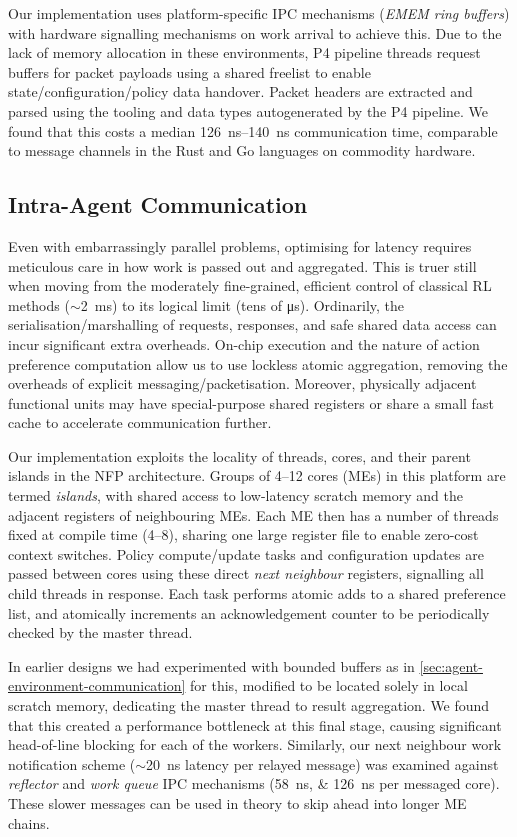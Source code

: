 \documentclass[sigconf,natbib=false]{acmart}
\begin{document}
Our implementation uses platform-specific IPC mechanisms (\emph{EMEM ring buffers}) with hardware signalling mechanisms on work arrival to achieve this.
Due to the lack of memory allocation in these environments, P4 pipeline threads request buffers for packet payloads using a shared freelist to enable state/configuration/policy data handover.
Packet headers are extracted and parsed using the tooling and data types autogenerated by the P4 pipeline.
We found that this costs a median \SIrange{126}{140}{\nano\second} communication time, comparable to message channels in the Rust and Go languages on commodity hardware.

\subsection{Intra-Agent Communication}
Even with embarrassingly parallel problems, optimising for latency requires meticulous care in how work is passed out and aggregated.
This is truer still when moving from the moderately fine-grained, efficient control of classical RL methods ($\sim$\SI{2}{\milli\second}) to its logical limit (tens of \si{\micro\second}).
Ordinarily, the serialisation/marshalling of requests, responses, and safe shared data access can incur significant extra overheads.
On-chip execution and the nature of action preference computation allow us to use lockless atomic aggregation, removing the overheads of explicit messaging/packetisation.
Moreover, physically adjacent functional units may have special-purpose shared registers or share a small fast cache to accelerate communication further.

Our implementation exploits the locality of threads, cores, and their parent islands in the NFP architecture.
Groups of \numrange{4}{12} cores (MEs) in this platform are termed \emph{islands}, with shared access to low-latency scratch memory and the adjacent registers of neighbouring MEs.
Each ME then has a number of threads fixed at compile time (\numrange{4}{8}), sharing one large register file to enable zero-cost context switches.
Policy compute/update tasks and configuration updates are passed between cores using these direct \emph{next neighbour} registers, signalling all child threads in response.
Each task performs atomic adds to a shared preference list, and atomically increments an acknowledgement counter to be periodically checked by the master thread.

In earlier designs we had experimented with bounded buffers as in \cref{sec:agent-environment-communication} for this, modified to be located solely in local scratch memory, dedicating the master thread to result aggregation.
We found that this created a performance bottleneck at this final stage, causing significant head-of-line blocking for each of the workers.
Similarly, our next neighbour work notification scheme ($\sim$\SI{20}{\nano\second} latency per relayed message) was examined against \emph{reflector} and \emph{work queue} IPC mechanisms (\SIlist{58;126}{\nano\second} per messaged core).
These slower messages can be used in theory to skip ahead into longer ME chains.
\end{document}
